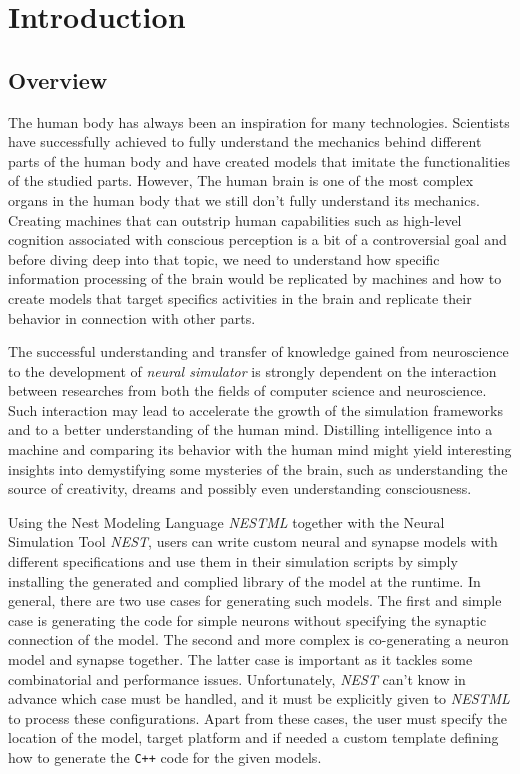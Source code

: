 \chapter{Introduction}

\section{Overview}
The human body has always been an inspiration for many technologies. Scientists have successfully achieved to fully understand the mechanics behind different parts of the human body and have created models that imitate the functionalities of the studied parts. However, The human brain is one of the most complex organs in the human body \cite{nolte2002human} that we still don’t fully understand its mechanics. Creating machines that can outstrip human capabilities such as high-level cognition associated with conscious perception is a bit of a controversial goal and before diving deep into that topic, we need to understand how specific information processing of the brain would be replicated by machines and how to create models that target specifics activities in the brain and replicate their behavior in connection with other parts.

The successful understanding and transfer of knowledge gained from neuroscience to the development of \emph{neural simulator} is strongly dependent on the interaction between researches from both the fields of computer science and neuroscience. Such interaction may lead to accelerate the growth of the simulation frameworks and to a better understanding of the human mind. Distilling intelligence into a machine and comparing its behavior with the human mind might yield interesting insights into demystifying some mysteries of the brain, such as understanding the source of creativity, dreams and possibly even understanding consciousness.

Using the Nest Modeling Language \emph{NESTML} together with the Neural Simulation Tool \emph{NEST}, users can write custom neural and synapse models with different specifications and use them in their simulation scripts by simply installing the generated and complied library of the model at the runtime. In general, there are two use cases for generating such models. The first and simple case is generating the code for simple neurons without specifying the synaptic connection of the model. The second and more complex is co-generating a neuron model and synapse together. The latter case is important as it tackles some combinatorial and performance issues. Unfortunately, \emph{NEST} can't know in advance which case must be handled, and it must be explicitly given to \emph{NESTML} to process these configurations. Apart from these cases, the user must specify the location of the model, target platform and if needed a custom template defining how to generate the \texttt{C++} code for the given models.

